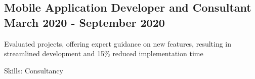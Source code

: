 \subsection{{Mobile Application Developer and Consultant \hfill March 2020 - September 2020}}
\begin{zitemize}

\setlength\itemsep{0.5em}

\item Evaluated projects, offering expert guidance on new features, resulting in streamlined development and 15\% reduced implementation time

\item[] Skills: Consultancy
\end{zitemize}